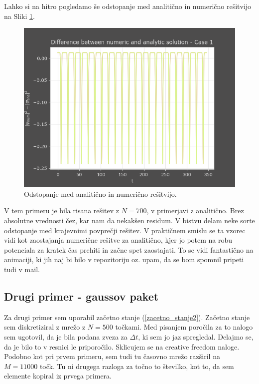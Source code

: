 \documentclass[a4paper]{article}
\begin{document}
Lahko si na hitro pogledamo še odstopanje med analitično in numerično rešitvijo na Sliki \ref{fig:harmonic_oscillator_error}.

\begin{figure}[p]
    \centering
    \includegraphics[width=\textwidth]{./images/delta_numeric_analytic_N700.png}
    \caption{Odstopanje med analitično in numerično rešitvijo.}
    \label{fig:harmonic_oscillator_error}
\end{figure}

V tem primeru je bila risana rešitev z $N=700$, v primerjavi z analitično. Brez absolutne vrednosti
čez, kar nam da nekakšen residum. V bistvu delam neke sorte odstopanje med krajevnimi povprečji rešitev. 
V praktičnem smislu se ta vzorec vidi kot zaostajanja numerične rešitve za analitično, kjer jo potem na 
robu potenciala za kratek čas prehiti in začne spet zaostajati. To se vidi fantastično na animaciji, ki jih
naj bi bilo v repozitoriju oz. upam, da se bom spomnil pripeti tudi v mail. \\

\subsection{Drugi primer - gaussov paket}
Za drugi primer sem uporabil začetno stanje (\ref{zacetno_stanje2}).
Začetno stanje sem diskretiziral z mrežo z $N=500$ točkami. Med pisanjem poročila za to nalogo
sem ugotovil, da je bila podana zveza za $\Delta t$, ki sem jo jaz spregledal. Delajmo se, da je bilo to
v resnici le priporočilo. Sklicujem se na creative freedom naloge. Podobno kot pri prvem primeru, sem tudi
tu časovno mrežo razširil na $M=11000$ točk. Tu ni drugega razloga za točno to številko, kot to, da sem 
elemente kopiral iz prvega primera. \\
\end{document}
